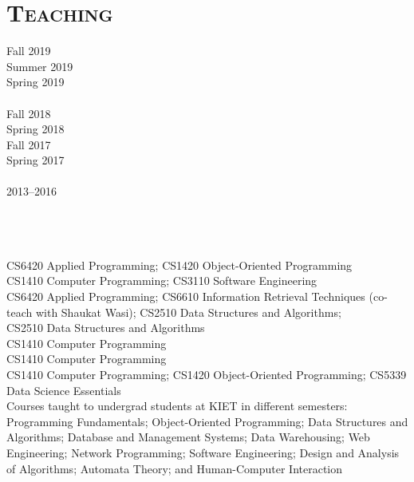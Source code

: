 \documentclass[a4paper, 10pt]{article}
\begin{document}
\section*{\normalfont\textsc{Teaching}}
\hfill\begin{minipage}{0.23\textwidth}
Fall 2019\textcolor{lightgray}{\dotfill}\\
Summer 2019\textcolor{lightgray}{\dotfill}\\
Spring 2019\textcolor{lightgray}{\dotfill}\\\\
Fall 2018\textcolor{lightgray}{\dotfill}\\
Spring 2018\textcolor{lightgray}{\dotfill}\\
Fall 2017\textcolor{lightgray}{\dotfill}\\
Spring 2017\textcolor{lightgray}{\dotfill}\\\\
2013--2016\textcolor{lightgray}{\dotfill}\\\\\\\\
\end{minipage}
\begin{minipage}{0.75\textwidth}
CS6420 Applied Programming; CS1420 Object-Oriented Programming\\
CS1410 Computer Programming; CS3110 Software Engineering\\
CS6420 Applied Programming; CS6610 Information Retrieval Techniques (co-teach with Shaukat Wasi); CS2510 Data Structures and Algorithms;\\
CS2510 Data Structures and Algorithms\\
CS1410 Computer Programming\\
CS1410 Computer Programming\\
CS1410 Computer Programming; CS1420 Object-Oriented Programming; CS5339 Data Science Essentials\\
Courses taught to undergrad students at KIET in different semesters: Programming Fundamentals; Object-Oriented Programming; Data Structures and Algorithms; Database and Management Systems; Data Warehousing; Web Engineering; Network Programming; Software Engineering; Design and Analysis of Algorithms; Automata Theory; and Human-Computer Interaction
\end{minipage}
\end{document}
